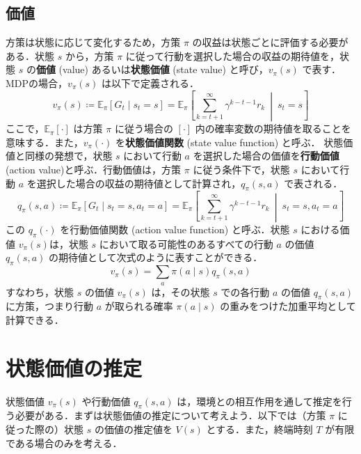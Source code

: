 \subsection{価値}
方策は状態に応じて変化するため，方策 $\pi$ の収益は状態ごとに評価する必要がある．状態 $s$ から，方策 $\pi$ に従って行動を選択した場合の収益の期待値を，状態 $s$ の\textbf{価値} (value) あるいは\textbf{状態価値} (state value) と呼び，$v_\pi(s)$ で表す．MDPの場合，$v_\pi(s)$ は以下で定義される．
\begin{equation}
v_\pi(s) \coloneqq  \mathbb{E}_\pi \left[G_t \mid s_t = s \right]=\mathbb{E}_\pi \left[\sum_{k=t+1}^{\infty}\gamma^{k-t-1} r_{k}\ \middle|\ s_t = s \right]
\end{equation}
ここで，$\mathbb{E}_\pi \left[\cdot \right]$ は方策 $\pi$ に従う場合の $[\cdot]$ 内の確率変数の期待値を取ることを意味する．また，$v_\pi(\cdot)$ を\textbf{状態価値関数} (state value function) と呼ぶ．
状態価値と同様の発想で，状態 $s$ において行動 $a$ を選択した場合の価値を\textbf{行動価値} (action value)と呼ぶ．行動価値は，方策 $\pi$ に従う条件下で，状態 $s$ において行動 $a$ を選択した場合の収益の期待値として計算され，$q_\pi (s, a)$ で表される．
\begin{equation}
q_\pi(s, a) \coloneqq  \mathbb{E}_\pi \left[G_t \mid s_t = s, a_t=a \right]= \mathbb{E}_\pi \left[\sum_{k=t+1}^{\infty}\gamma^{k-t-1} r_{k}\ \middle|\ s_t = s, a_t=a \right]
\end{equation}
この $q_\pi (\cdot)$ を行動価値関数 (action value function) と呼ぶ．状態 $s$ における価値 $v_\pi(s)$は，状態 $s$ において取る可能性のあるすべての行動 $a$ の価値 $q_\pi(s, a)$ の期待値として次式のように表すことができる．
\begin{equation}
v_\pi(s) = \sum_{a} \pi(a \mid s) q_\pi(s, a)
\end{equation}
すなわち，状態 $s$ の価値 $v_\pi(s)$ は，その状態 $s$ での各行動 $a$ の価値 $q_\pi(s, a)$ に方策，つまり行動 $a$ が取られる確率 $\pi(a \mid s)$ の重みをつけた加重平均として計算できる．
\section{状態価値の推定}
状態価値 $v_\pi(s)$ や行動価値 $q_\pi(s, a)$ は，環境との相互作用を通して推定を行う必要がある．まずは状態価値の推定について考えよう．以下では（方策 $\pi$ に従った際の）状態 $s$ の価値の推定値を $V(s)$ とする．また，終端時刻 $T$ が有限である場合のみを考える．
